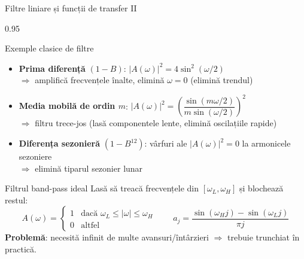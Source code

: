 \documentclass[9pt, aspectratio=169, t]{beamer}
\begin{document}
\begin{frame}{Filtre liniare și funcții de transfer II}
    \begin{cminipage}{0.95\textwidth}
    \vspace{-2mm}
    \begin{exampleblock}{Exemple clasice de filtre}
        \begin{itemize}\setlength{\itemsep}{1pt}
            \item \textbf{Prima diferență} $(1-B)$: \quad $|A(\omega)|^2 = 4\sin^2(\omega/2)$\\
                  $\Rightarrow$ amplifică frecvențele înalte, elimină $\omega = 0$ (elimină trendul)
            \item \textbf{Media mobilă de ordin $m$}: \quad $|A(\omega)|^2 = \left(\dfrac{\sin(m\omega/2)}{m\sin(\omega/2)}\right)^2$\\
                  $\Rightarrow$ filtru trece-jos (lasă componentele lente, elimină oscilațiile rapide)
            \item \textbf{Diferența sezonieră} $(1-B^{12})$: \quad vârfuri ale $|A(\omega)|^2 = 0$ la armonicele sezoniere\\
                  $\Rightarrow$ elimină tiparul sezonier lunar
        \end{itemize}
    \end{exampleblock}
    \vspace{-2mm}
    \begin{block}{Filtrul band-pass ideal}
        {\small Lasă să treacă frecvențele din $[\omega_L, \omega_H]$ și blochează restul:
        \[
            A(\omega) = \begin{cases} 1 & \text{dacă } \omega_L \leq |\omega| \leq \omega_H \\ 0 & \text{altfel} \end{cases}
            \qquad a_j = \frac{\sin(\omega_H j) - \sin(\omega_L j)}{\pi j}
        \]
        \textbf{Problemă}: necesită infinit de multe avansuri/întârzieri $\Rightarrow$ trebuie trunchiat în practică.}
    \end{block}
    \end{cminipage}
\end{frame}
\end{document}

